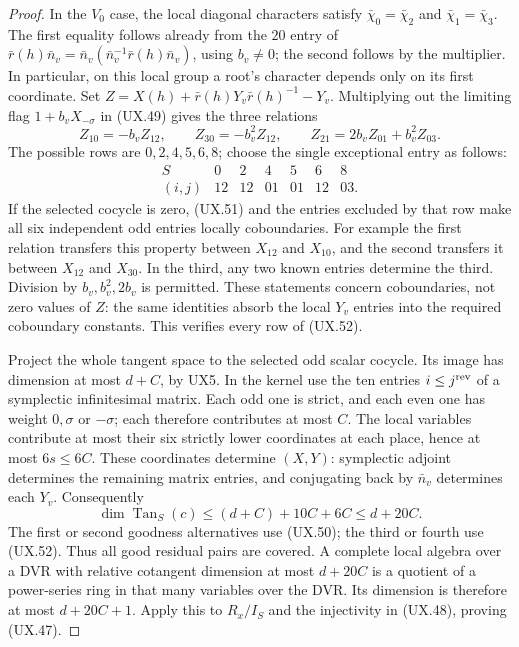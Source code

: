 \begin{proof}
In the $V_0$ case, the local diagonal
characters satisfy $\bar\chi_0=\bar\chi_2$
and $\bar\chi_1=\bar\chi_3$.  The first
equality follows already from the $20$
entry of $\bar r(h)\bar n_v=
\bar n_v(\bar n_v^{-1}\bar r(h)\bar n_v)$,
using $b_v\ne0$; the second follows by
the multiplier.  In particular, on
this local group a root's character
depends only on its first coordinate.
Set
$Z=X(h)+\bar r(h)Y_v\bar r(h)^{-1}-Y_v$.
Multiplying out the limiting flag
$1+b_vX_{-\sigma}$ in (UX.49) gives
the three relations
\[
 Z_{10}=-b_vZ_{12},\qquad
 Z_{30}=-b_v^2Z_{12},\qquad
 Z_{21}=2b_vZ_{01}+b_v^2Z_{03}.
 \tag{UX.51}
\]
The possible rows are $0,2,4,5,6,8$;
choose the single exceptional entry as follows:
\[
 \begin{array}{c|rrrrrr}
 S&0&2&4&5&6&8\\ \hline
 (i,j)&12&12&01&01&12&03 .
 \end{array}
 \tag{UX.52}
\]
If the selected cocycle is zero, (UX.51)
and the entries excluded by that row
make all six independent odd entries
locally coboundaries.  For example the
first relation transfers this property
between $X_{12}$ and $X_{10}$, and
the second transfers it between
$X_{12}$ and $X_{30}$.  In the third,
any two known entries determine the
third.  Division by $b_v,b_v^2,2b_v$
is permitted.  These statements concern
coboundaries, not zero values of $Z$:
the same identities absorb the local
$Y_v$ entries into the required
coboundary constants.  This verifies
every row of (UX.52).

Project the whole tangent space to the
selected odd scalar cocycle.  Its image
has dimension at most $d+C$, by UX5.
In the kernel use the ten entries
$i\le j^{\rm rev}$ of a symplectic
infinitesimal matrix.  Each odd one
is strict, and each even one has
weight $0,\sigma$ or $-\sigma$;
each therefore contributes at most
$C$.  The local variables contribute
at most their six strictly lower
coordinates at each place, hence
at most $6s\le6C$.
These coordinates determine $(X,Y)$:
symplectic adjoint determines the
remaining matrix entries, and
conjugating back by $\bar n_v$
determines each $Y_v$.
Consequently
\[
 \dim\operatorname{Tan}_S(c)
        \le(d+C)+10C+6C
        \le d+20C.
 \tag{UX.53}
\]
The first or second goodness alternatives
use (UX.50); the third or fourth use
(UX.52).  Thus all good residual pairs
are covered.  A complete local algebra
over a DVR with relative cotangent
dimension at most $d+20C$ is a quotient
of a power-series ring in that many
variables over the DVR.  Its dimension
is therefore at most $d+20C+1$.
Apply this to $R_x/I_S$ and the
injectivity in (UX.48), proving (UX.47).
\end{proof}

